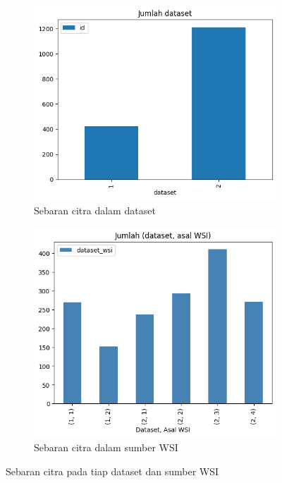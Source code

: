 \begin{figure}[H]
	\centering
	\begin{subfigure}[b]{0.4\textwidth}
		\centering
		\includegraphics[width=\textwidth]{gambar/bab4/dataset.png}
		\caption{Sebaran citra dalam dataset}
		\label{fig:d_dataset}
	\end{subfigure}
	\hspace{0.05\textwidth}
	\begin{subfigure}[b]{0.4\textwidth}
		\centering
		\includegraphics[width=\textwidth]{gambar/bab4/dataset_wsi.png}
		\caption{Sebaran citra dalam sumber WSI}
		\label{fig:d_WSI}
	\end{subfigure}	
	\caption{Sebaran citra pada tiap dataset dan sumber WSI}
	\label{fig:diagram_sebaran}
\end{figure}

